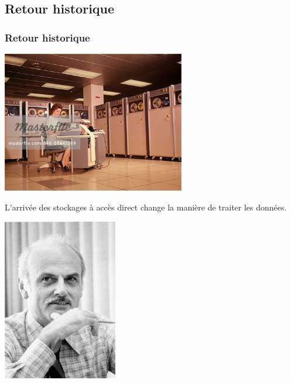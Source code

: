 \documentclass[svgnames,11pt]{beamer}
\begin{document}
\subsection{Retour historique}
\begin{frame}
    \frametitle{Retour historique}

    \begin{center}
        \centering
        \includegraphics[width=8cm]{ressources/bande.jpg}
        \label{IMG}
    \end{center}
    \begin{aretenir}[Remarque]
        L'arrivée des stockages à accès direct change la manière de traiter les données.
    \end{aretenir}
\end{frame}
\begin{frame}

    \begin{center}
        \centering
        \includegraphics[width=5cm]{ressources/codd.jpg}
        \label{IMG}
    \end{center}
\end{frame}
\end{document}
